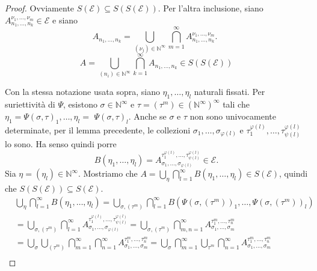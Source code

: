 \documentclass[a4paper, twoside]{article}
\newcommand{\N}{\mathbb{N}}
\newcommand{\<}{\langle}
\renewcommand{\>}{\rangle}
\begin{document}
\begin{proof}
	Ovviamente $S(\mathcal{E}) \subseteq S(S(\mathcal{E}))$. Per l'altra inclusione, siano $A_{n_{1}, \ldots, n_{k}}^{\nu_{1}, \ldots, \nu_{m}} \in \mathcal{E}$ e siano
	$$ A_{n_{1}, \ldots, n_{k}}=\bigcup_{(\nu_j) \in \mathbb{N}^{\infty}} \bigcap_{m=1}^{\infty} A_{n_{1}, \ldots, n_{k}}^{\nu_{1}, \ldots, \nu_{m}} \text {. }	$$
	$$	A=\bigcup_{\left(n_{i}\right) \in \mathbb{N}^{\infty}} \bigcap_{k=1}^{\infty} A_{n_{1}, \ldots, n_{k}} \in S(S(\mathcal{E}))$$
	
	Con la stessa notazione usata sopra, siano $\eta_{1}, \ldots, \eta_{l}$ naturali fissati. Per suriettività di $\Psi$, esistono $\sigma \in \mathbb{N}^{\infty}$ e $\tau=\left(\tau^{m}\right) \in\left(\mathbb{N}^{\infty}\right)^{\infty}$ tali che $\eta_{1}=\Psi(\sigma, \tau)_{1}, \ldots, \eta_{l}=$ $\Psi(\sigma, \tau)_{l}$. Anche se $\sigma$ e $\tau$ non sono univocamente determinate, per il lemma precedente, le collezioni $\sigma_{1}, \ldots, \sigma_{\varphi(l)}$ e $\tau_{1}^{\varphi(l)}, \ldots, \tau_{\psi(l)}^{\varphi(l)}$ lo sono. Ha senso quindi porre
	$$
	B\left(\eta_{1}, \ldots, \eta_{l}\right)=A_{\sigma_{1}, \ldots, \sigma_{\varphi(l)}}^{\tau_{1}^{\varphi(l)}, \ldots, \tau_{\psi(l)}^{\varphi(l)}} \in \mathcal{E} .
	$$
	Sia $\eta=\left(\eta_{l}\right)\in \N^{\infty}$. Mostriamo che $A=\bigcup_{\eta} \bigcap_{l=1}^{\infty} B\left(\eta_{1}, \ldots, \eta_{l}\right) \in S(\mathcal{E})$, quindi che $S(S(\mathcal{E})) \subseteq S(\mathcal{E})$.
	$$
	\begin{aligned}
		&\bigcup_{\eta} \bigcap_{l=1}^{\infty} B\left(\eta_{1}, \ldots, \eta_{l}\right)=\bigcup_{\sigma,\left(\tau^{m}\right)} \bigcap_{l=1}^{\infty} B\left(\Psi\left(\sigma,\left(\tau^{m}\right)\right)_{1}, \ldots, \Psi\left(\sigma,\left(\tau^{m}\right)\right)_{l}\right) \\
		&=\bigcup_{\sigma,\left(\tau^{m}\right)} \bigcap_{l=1}^{\infty} A_{\sigma_{1}, \ldots, \sigma_{\varphi(l)}}^{\tau_{1}^{\varphi(l)}, \ldots, \tau_{\psi(l)}^{\varphi(l)}}=\bigcup_{\sigma,\left(\tau^{m}\right)} \bigcap_{m, n=1}^{\infty} A_{\sigma_{1}, \ldots, \sigma_{m}}^{\tau_{1}^{m}, \ldots, \tau_{n}^{m}} \\
		&=\bigcup_{\sigma} \bigcup_{\left(\tau^{m}\right)} \bigcap_{m=1}^{\infty} \bigcap_{n=1}^{\infty} A_{\sigma_{1}, \ldots, \sigma_{m}}^{\tau_{1}^{m}, \ldots, \tau_{n}^{m}}=\bigcup_{\sigma} \bigcap_{m=1}^{\infty} \bigcup_{\tau^{m}} \bigcap_{n=1}^{\infty} A_{\sigma_{1}, \ldots, \sigma_{m}}^{\tau_{1}^{m}, \ldots, \tau_{n}^{m}} \\

\end{aligned}$$
\end{proof}
\end{document}
